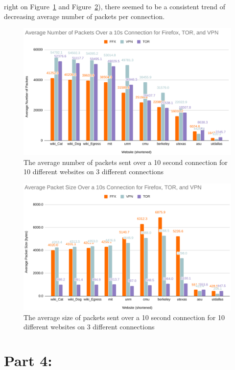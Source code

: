 \documentclass[11pt]{article}
\begin{document}
right on Figure~\ref{fig:avg_packets} and Figure~\ref{fig:avg_size}), there seemed to be a consistent
trend of decreasing average number of packets per connection. 
\begin{figure}[p]
  \centering
  \includegraphics[width=1\linewidth]{./average_packets.png}
  \caption{\label{fig:avg_packets}
  The average number of packets sent over a 10 second connection for 10 different websites on 3 different connections}
\end{figure}
\begin{figure}[p]
  \centering
  \includegraphics[width=1\linewidth]{./average_size.png}
  \caption{\label{fig:avg_size}
  The average size of packets sent over a 10 second connection for 10 different websites on 3 different connections}
\end{figure}
\section*{Part 4:}

\end{document}
